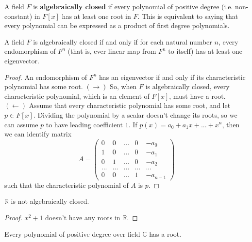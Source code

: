     \begin{definition}
      A field $F$ is \textbf{algebraically closed} if every polynomial of positive degree (i.e. non-constant) in $F[x]$ has at least one root in $F$. This is equivalent to saying that every polynomial can be expressed as a product of first degree polynomials.
    \end{definition}

    \begin{proposition}
      A field $F$ is algebraically closed if and only if for each natural number $n$, every endomorphism of $F^n$ (that is, ever linear map from $F^n$ to itself) has at least one eigenvector. 
    \end{proposition}
    \begin{proof}
      An endomorphism of $F^n$ has an eigenvector if and only if its characteristic polynomial has some root. $(\rightarrow)$ So, when $F$ is algebraically closed, every characteristic polynomial, which is an element of $F[x]$, must have a root. $(\leftarrow)$ Assume that every characteristic polynomial has some root, and let $p \in F[x]$. Dividing the polynomial by a scalar doesn't change its roots, so we can assume $p$ to have leading coefficient $1$. If $p(x) = a_0 + a_1 x + ... + x^n$, then we can identify matrix 
      \begin{equation}
        A = \begin{pmatrix}
        0 & 0 & ... & 0 & -a_0 \\
        1 & 0 & ... & 0 & -a_1 \\
        0 & 1 & ... & 0 & -a_2 \\
        ... & ... & ... & ... & ... \\
        0 & 0 & ... & 1 & -a_{n-1}
        \end{pmatrix}
      \end{equation}
      such that the characteristic polynomial of $A$ is $p$. 
    \end{proof}

    \begin{proposition}
      $\mathbb{R}$ is not algebraically closed. 
    \end{proposition}
    \begin{proof}
      $x^2 + 1$ doesn't have any roots in $\mathbb{R}$. 
    \end{proof}

    \begin{theorem}
      Every polynomial of positive degree over field $\mathbb{C}$ has a root. 
    \end{theorem}


